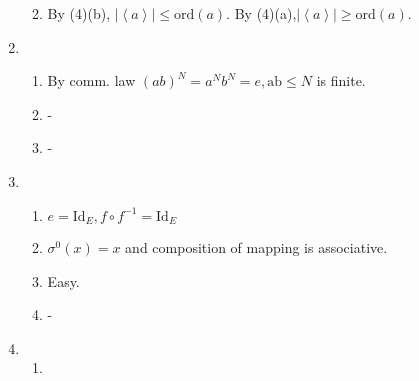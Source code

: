 \documentclass[12pt]{article}
\begin{document}
\begin{enumerate}
\begin{enumerate}
\begin{enumerate}
                \end{enumerate}
            \item By (4)(b), $\left|\left \langle a \right \rangle \right|\le \mathrm{ord}(a)$. By (4)(a),$\left|\left \langle a \right \rangle \right|\ge \mathrm{ord}(a)$.
        \end{enumerate}
    \item 
        \begin{enumerate}
            \item By comm. law $(ab)^{N}=a^N b^N=e, \mathrm{ab}\le N$ is finite.
            \item -
            \item -
        \end{enumerate}
    \item 
        \begin{enumerate}
            \item $e=\mathrm{Id}_E,f\circ f^{-1}=\mathrm{Id}_E$
            \item $\sigma^0(x)=x$ and composition of mapping is associative.
            \item Easy.
            \item -
        \end{enumerate}
    \item 
        \begin{enumerate}
            \item 
        \end{enumerate}
\end{enumerate}
\end{document}
